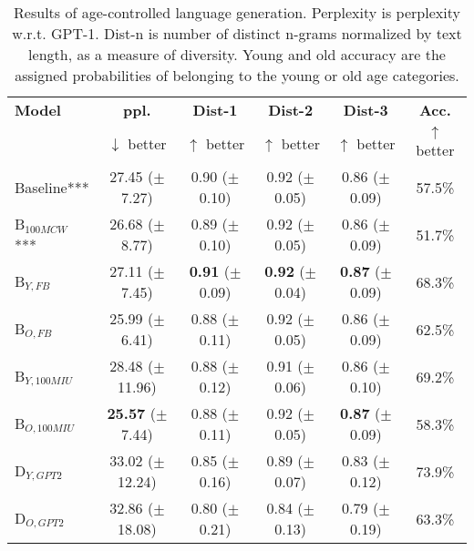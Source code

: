 \begin{table*}[h]
    \centering
    \begin{tabular}{l c c c c c}
    \toprule
    \textbf{Model} & \textbf{ppl.} & \textbf{Dist-1} & \textbf{Dist-2} & \textbf{Dist-3} & \textbf{Acc.}\\
     & $\downarrow$ better & $\uparrow$ better & $\uparrow$ better & $\uparrow$ better & $\uparrow$ better\\
    \midrule
    \midrule
    Baseline*** & 27.45 ($\pm$7.27) & 0.90 ($\pm$0.10) & 0.92 ($\pm$0.05) & 0.86 ($\pm$0.09) & 57.5\%\\
    \midrule
    B$_{100MCW}$*** & 26.68 ($\pm$8.77) & 0.89 ($\pm$0.10) & 0.92 ($\pm$0.05) & 0.86 ($\pm$0.09) & 51.7\%\\
    B$_{Y, FB}$ & 27.11 ($\pm$7.45) & \textbf{0.91} ($\pm$0.09) & \textbf{0.92} ($\pm$0.04) & \textbf{0.87} ($\pm$0.09) & 68.3\%\\
    B$_{O, FB}$ & 25.99 ($\pm$6.41) & 0.88 ($\pm$0.11) & 0.92 ($\pm$0.05) & 0.86 ($\pm$0.09) & 62.5\%\\
    B$_{Y, 100MIU}$ & 28.48 ($\pm$11.96) & 0.88 ($\pm$0.12) & 0.91 ($\pm$0.06) & 0.86 ($\pm$0.10) & 69.2\%\\
    B$_{O, 100MIU}$ & \textbf{25.57} ($\pm$7.44) & 0.88 ($\pm$0.11) & 0.92 ($\pm$0.05) & \textbf{0.87} ($\pm$0.09) & 58.3\%\\
    \midrule
    D$_{Y, GPT2}$ & 33.02 ($\pm$12.24) & 0.85 ($\pm$0.16) & 0.89 ($\pm$0.07) & 0.83 ($\pm$0.12) & 73.9\%\\
    D$_{O, GPT2}$ & 32.86 ($\pm$18.08) & 0.80 ($\pm$0.21) & 0.84 ($\pm$0.13) & 0.79 ($\pm$0.19) & 63.3\%\\
    \bottomrule
    \end{tabular}
    \caption{ Results of age-controlled language generation. Perplexity is perplexity w.r.t. GPT-1. Dist-n is number of distinct n-grams normalized by text length, as a measure of diversity. Young and old accuracy are the assigned probabilities of belonging to the young or old age categories.}
    \label{tab:ctg_results}
\end{table*}


